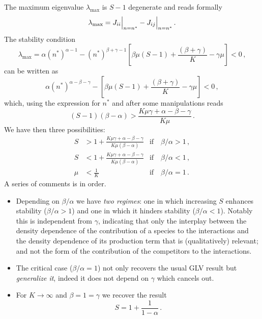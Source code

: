 \documentclass[10pt]{article}
\begin{document}
The maximum eigenvalue $\lambda_{\textrm{max}}$ is $S-1$ degenerate and reads formally
\begin{equation}
    \lambda_{\textrm{max}} = J_{ii}\Big{|}_{n=n^*} - J_{ij}\Big{|}_{n=n^*} \, .
\end{equation}
The stability condition
\begin{equation}
    \lambda_{\textrm{max}} = \alpha (n^*)^{\alpha-1}-(n^*)^{\beta+\gamma-1}\left[\beta \mu(S-1)
    +\frac{(\beta+\gamma)}{K}-\gamma\mu\right]<0 \, ,
\end{equation}
can be written as
\begin{equation}
    \alpha (n^*)^{\alpha-\beta-\gamma}-\left[\beta \mu(S-1)
    +\frac{(\beta+\gamma)}{K}-\gamma\mu\right]<0 \, ,
\end{equation}
which, using the expression for $n^*$ and after some manipulations reads
\begin{equation}
    (S-1)(\beta-\alpha) > \frac{K\mu\gamma+\alpha-\beta-\gamma}{K\mu} \, .
\end{equation}
We have then three possibilities:
\begin{align}
    S &> 1 + \frac{K\mu\gamma+\alpha-\beta-\gamma}{K\mu(\beta-\alpha)} 
    &\textrm{if} \quad \beta/\alpha>1 \, , \\
    S &< 1 + \frac{K\mu\gamma+\alpha-\beta-\gamma}{K\mu(\beta-\alpha)} 
    &\textrm{if} \quad \beta/\alpha<1 \, , \\
    \mu &< \frac{1}{K} &\textrm{if} \quad \beta/\alpha=1 \, .
\end{align}
A series of comments is in order. 
\begin{itemize}
    \item Depending on $\beta/\alpha$ we have \textit{two
    regimes}: one in which increasing $S$ enhances stability ($\beta/\alpha>1$) and 
    one in which it hinders stability ($\beta/\alpha<1$).
    Notably this is independent from $\gamma$, indicating that only the interplay between
    the density dependence of the contribution of a species to the interactions and
    the density dependence of its production term that is (qualitatively) relevant; 
    and not the form of the contribution of the competitors to the interactions.
    \item The critical case ($\beta/\alpha=1$) not only recovers the usual GLV result
    but \textit{generalize it}, indeed it does not depend on $\gamma$ which cancels out.
    \item For $K\to\infty$ and $\beta=1=\gamma$ we recover the result
    \begin{equation}
        S=1+\frac{1}{1-\alpha} \, .
    \end{equation}
\end{itemize}
\end{document}
